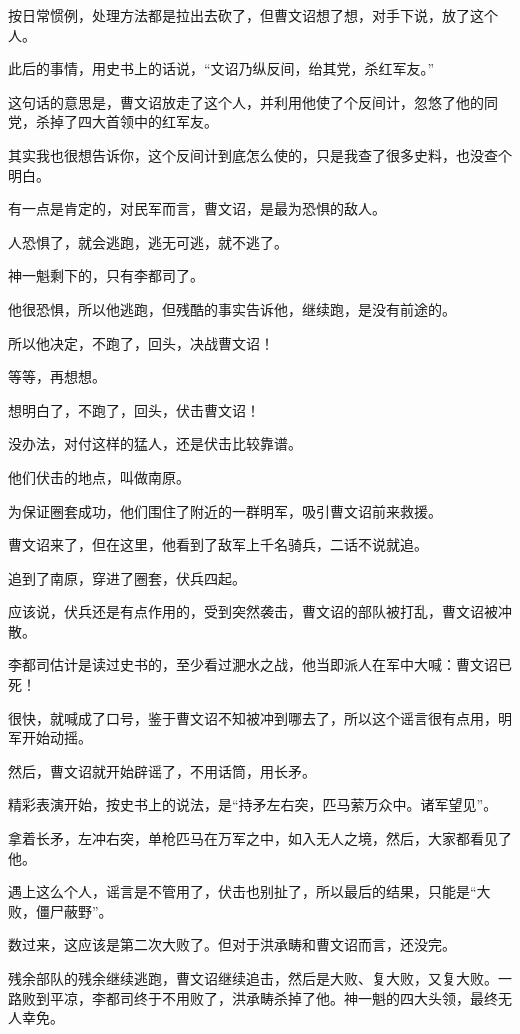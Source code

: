 \begin{multicols}{\theparacolNo}
		按日常惯例，处理方法都是拉出去砍了，但曹文诏想了想，对手下说，放了这个人。

		此后的事情，用史书上的话说，“文诏乃纵反间，绐其党，杀红军友。”

		这句话的意思是，曹文诏放走了这个人，并利用他使了个反间计，忽悠了他的同党，杀掉了四大首领中的红军友。

		其实我也很想告诉你，这个反间计到底怎么使的，只是我查了很多史料，也没查个明白。

		有一点是肯定的，对民军而言，曹文诏，是最为恐惧的敌人。

		人恐惧了，就会逃跑，逃无可逃，就不逃了。

		神一魁剩下的，只有李都司了。

		他很恐惧，所以他逃跑，但残酷的事实告诉他，继续跑，是没有前途的。

		所以他决定，不跑了，回头，决战曹文诏！

		等等，再想想。

		想明白了，不跑了，回头，伏击曹文诏！

		没办法，对付这样的猛人，还是伏击比较靠谱。

		他们伏击的地点，叫做南原。

		为保证圈套成功，他们围住了附近的一群明军，吸引曹文诏前来救援。

		曹文诏来了，但在这里，他看到了敌军上千名骑兵，二话不说就追。

		追到了南原，穿进了圈套，伏兵四起。

		应该说，伏兵还是有点作用的，受到突然袭击，曹文诏的部队被打乱，曹文诏被冲散。

		李都司估计是读过史书的，至少看过淝水之战，他当即派人在军中大喊：曹文诏已死！

		很快，就喊成了口号，鉴于曹文诏不知被冲到哪去了，所以这个谣言很有点用，明军开始动摇。

		然后，曹文诏就开始辟谣了，不用话筒，用长矛。

		精彩表演开始，按史书上的说法，是“持矛左右突，匹马萦万众中。诸军望见”。

		拿着长矛，左冲右突，单枪匹马在万军之中，如入无人之境，然后，大家都看见了他。

		遇上这么个人，谣言是不管用了，伏击也别扯了，所以最后的结果，只能是“大败，僵尸蔽野”。

		数过来，这应该是第二次大败了。但对于洪承畴和曹文诏而言，还没完。

		残余部队的残余继续逃跑，曹文诏继续追击，然后是大败、复大败，又复大败。一路败到平凉，李都司终于不用败了，洪承畴杀掉了他。神一魁的四大头领，最终无人幸免。


\end{multicols}
